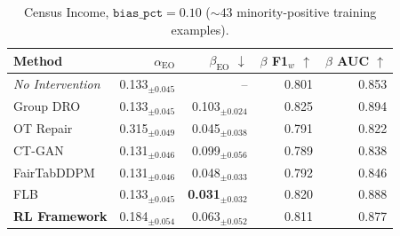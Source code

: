 \begin{table}[ht]
  \centering
  \small
  \caption{Census Income, $\texttt{bias\_pct}=0.10$ (${\sim}43$ minority-positive training examples).}
  \label{tab:census_b010}
  \begin{tabular}{lrrrr}
    \toprule
    \textbf{Method} & $\alpha_\text{EO}$ & $\beta_\text{EO}$ $\downarrow$ & $\beta$ F1$_w$ $\uparrow$ & $\beta$ AUC $\uparrow$ \\
    \midrule
    \textit{No Intervention} & 0.133$_{\pm 0.045}$ & -- & 0.801 & 0.853 \\
    \midrule
    Group DRO & 0.133$_{\pm 0.045}$ & 0.103$_{\pm 0.024}$ & 0.825 & 0.894 \\
    OT Repair & 0.315$_{\pm 0.049}$ & 0.045$_{\pm 0.038}$ & 0.791 & 0.822 \\
    CT-GAN & 0.131$_{\pm 0.046}$ & 0.099$_{\pm 0.056}$ & 0.789 & 0.838 \\
    FairTabDDPM & 0.131$_{\pm 0.046}$ & 0.048$_{\pm 0.033}$ & 0.792 & 0.846 \\
    FLB & 0.133$_{\pm 0.045}$ & \textbf{0.031$_{\pm 0.032}$} & 0.820 & 0.888 \\
    \textbf{RL Framework} & 0.184$_{\pm 0.054}$ & 0.063$_{\pm 0.052}$ & 0.811 & 0.877 \\
    \bottomrule
  \end{tabular}
\end{table}